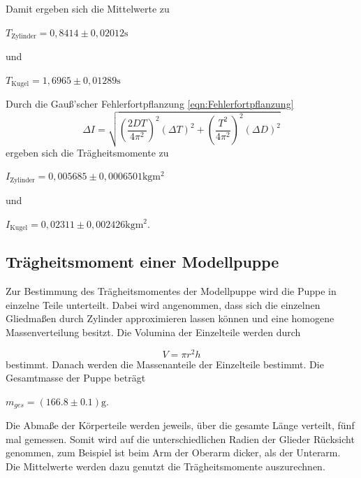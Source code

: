 Damit ergeben sich die Mittelwerte zu 

\begin{center}
  $T_{\text{Zylinder}} = 0,8414 \pm 0,02012 \si{\second} $
\end{center}

und

\begin{center}
  $ T_{\text{Kugel}} = 1,6965 \pm 0,01289 \si{\second} $
\end{center}

Durch die Gauß'scher Fehlerfortpflanzung \ref{eqn:Fehlerfortpflanzung}
\begin{equation}
  \Delta I = \sqrt{ (\frac{2DT}{4\pi^2})^2  (\Delta T)^2 + (\frac{T^2}{4\pi^2})^2 (\Delta D)^2}
  \label{eqn:Fehlerfortpflanzung}
\end{equation}
ergeben sich die Trägheitsmomente zu

\begin{center}
  $ I_{\text{Zylinder}} = 0,005685 \pm 0,0006501 \si{\kilogram\meter^2} $ 
\end{center}

und

\begin{center}
  $ I_{\text{Kugel}} = 0,02311 \pm 0,002426 \si{\kilogram\meter^2} $.
\end{center}


\subsection{Trägheitsmoment einer Modellpuppe}
\label{sec:Trägheitsmoment einer Modellpuppe}

Zur Bestimmung des Trägheitsmomentes der Modellpuppe wird die Puppe in einzelne Teile unterteilt. Dabei wird angenommen,
dass sich die einzelnen Gliedmaßen durch Zylinder approximieren lassen können und eine homogene Massenverteilung besitzt. Die
Volumina der Einzelteile werden durch

\begin{equation}
  V = \pi r^2h
  \label{eqn:Volumen}
\end{equation}
 bestimmt. Danach werden die Massenanteile der Einzelteile bestimmt. Die Gesamtmasse der Puppe beträgt 

\begin{center}
  $m_{ges} = (166.8\pm 0.1)\si{\gram}$.
\end{center}


Die Abmaße der Körperteile werden jeweils, über die gesamte Länge verteilt, fünf mal gemessen. Somit wird auf die unterschiedlichen
Radien der Glieder Rücksicht genommen, zum Beispiel ist beim Arm der Oberarm dicker, als der Unterarm. Die Mittelwerte werden dazu genutzt die
Trägheitsmomente auszurechnen.

